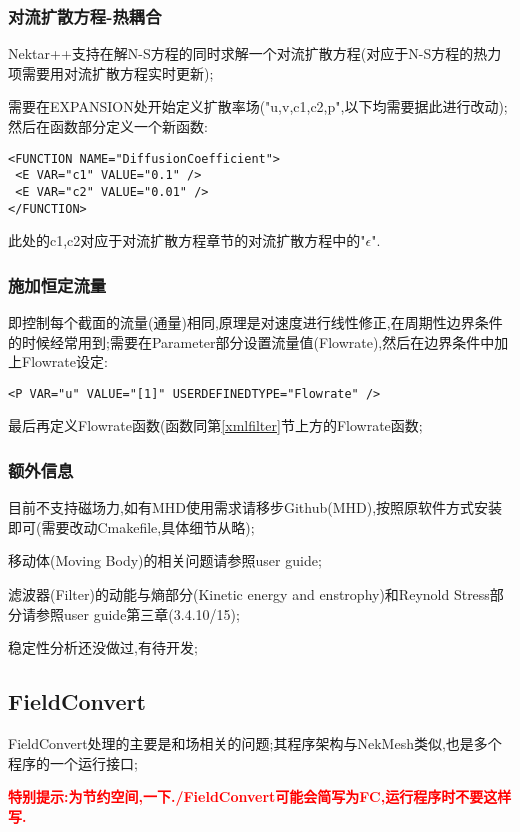 \subsubsection{对流扩散方程-热耦合}
Nektar++支持在解N-S方程的同时求解一个对流扩散方程(对应于N-S方程的热力项需要用对流扩散方程实时更新);\par
需要在EXPANSION处开始定义扩散率场("u,v,c1,c2,p",以下均需要据此进行改动);然后在函数部分定义一个新函数:
\begin{lstlisting}[frame=single]
<FUNCTION NAME="DiffusionCoefficient">
 <E VAR="c1" VALUE="0.1" />
 <E VAR="c2" VALUE="0.01" />
</FUNCTION>
\end{lstlisting}
\par
此处的c1,c2对应于对流扩散方程章节的对流扩散方程中的"$\epsilon$".


\subsubsection{施加恒定流量}
即控制每个截面的流量(通量)相同,原理是对速度进行线性修正,在周期性边界条件的时候经常用到;需要在Parameter部分设置流量值(Flowrate),然后在边界条件中加上Flowrate设定:
\begin{lstlisting}[frame=single]
<P VAR="u" VALUE="[1]" USERDEFINEDTYPE="Flowrate" />
\end{lstlisting}
\par
最后再定义Flowrate函数(函数同第\ref{xmlfilter}节上方的Flowrate函数;\par



\subsubsection{额外信息}
目前不支持磁场力,如有MHD使用需求请移步Github(MHD),按照原软件方式安装即可(需要改动Cmakefile,具体细节从略);\par
移动体(Moving Body)的相关问题请参照user guide;\par
滤波器(Filter)的动能与熵部分(Kinetic energy and enstrophy)和Reynold Stress部分请参照user guide第三章(3.4.10/15);\par
稳定性分析还没做过,有待开发;



\subsection{FieldConvert} \label{FieldConvert}
FieldConvert处理的主要是和场相关的问题;其程序架构与NekMesh类似,也是多个程序的一个运行接口;\par
\textcolor{red}{\textbf{特别提示:为节约空间,一下./FieldConvert可能会简写为FC,运行程序时不要这样写.}}

